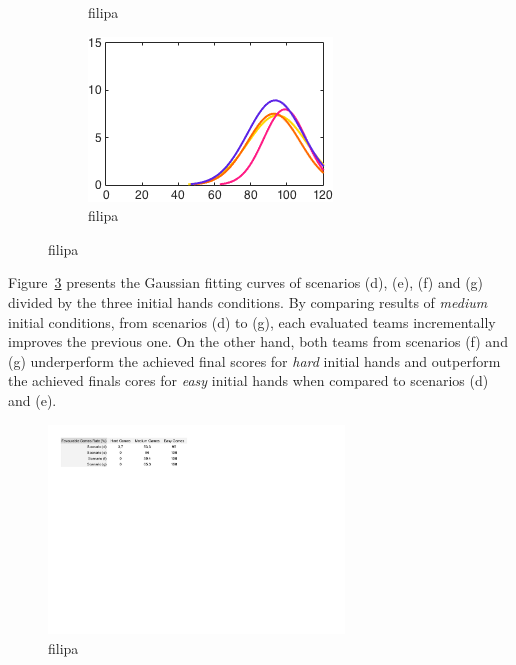 \begin{figure}[h]
\begin{subfigure}[h]{0.32\textwidth}
                \caption{filipa}
                \label{fig:DEFGmedium}
        \end{subfigure}
        \begin{subfigure}[h]{0.32\textwidth}
                \includegraphics[width=\textwidth]{./img/4/DEFGeasy}
                \caption{filipa}
                \label{fig:DEFGeasy}
        \end{subfigure}
        \caption{filipa}
        \label{fig:DEFG-CH}
\end{figure}

Figure~\ref{fig:DEFG-CH} presents the Gaussian fitting curves of scenarios (d), (e), (f) and (g) divided by the three initial hands conditions.
By comparing results of \emph{medium} initial conditions, from scenarios (d) to (g), each evaluated teams incrementally improves the previous one.
On the other hand, both teams from scenarios (f) and (g) underperform the achieved final scores for \emph{hard} initial hands and outperform the achieved finals cores for \emph{easy} initial hands when compared to scenarios (d) and (e).

\begin{figure}[h!]
  \centering
    \includegraphics[width=0.7\textwidth]{./img/4/DEFG-fgr}
  \caption{filipa}
\label{fig:DEFG-fgr}
\end{figure}

